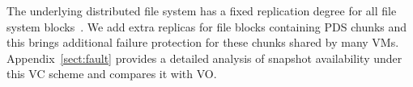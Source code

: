 \begin{itemize}



\end{itemize}
The underlying distributed  file system has  a fixed replication degree for 
all file system blocks~\cite{googlefs03,hdfs10}.
We add extra replicas for file blocks containing PDS chunks  
and this brings additional  failure protection for these chunks shared by many VMs.
Appendix~\ref{sect:fault} provides a detailed analysis of snapshot availability
under this VC scheme and compares it with VO.


